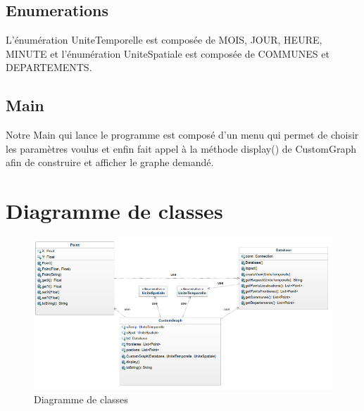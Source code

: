 \subsection{Enumerations}
 L'énumération UniteTemporelle est composée de MOIS, JOUR, HEURE, MINUTE et l'énumération UniteSpatiale est composée de COMMUNES et DEPARTEMENTS.
\subsection{Main}
  Notre Main qui lance le programme est composé d'un menu qui permet de choisir les paramètres voulus et enfin fait appel à la méthode display() de CustomGraph afin de construire et afficher le graphe demandé.
\newpage
  \section{Diagramme de classes}
  \vfill
  \begin{figure}[ht!]
    \centering
     \caption{Diagramme de classes }
     \includegraphics[scale=0.5]{RO.png}
  \end{figure}
  \vfill
